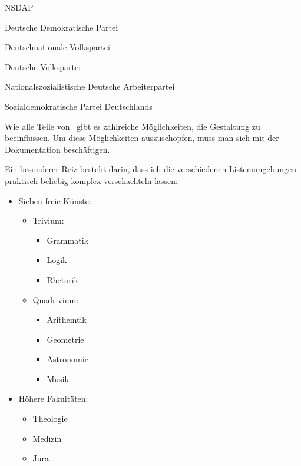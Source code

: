 \begin{lfgwexample}{}
 \begin{labeling}[=]{NSDAP}
  \item[DDP] Deutsche Demokratische Partei
  \item[DNVP] Deutschnationale Volkspartei
  \item[DVP] Deutsche Volkspartei
  \item[NSDAP] Nationalszozialistische Deutsche Arbeiterpartei
  \item[SPD] Sozialdemokratische Partei Deutschlands
 \end{labeling}
\end{lfgwexample}

Wie alle Teile von \KOMAScript\ gibt es zahlreiche Möglichkeiten, die Gestaltung zu
beeinflussen. Um diese Möglichkeiten auszuschöpfen, muss man sich mit der Dokumentation 
beschäftigen.



Ein besonderer Reiz besteht darin, dass ich die verschiedenen Listenumgebungen praktisch
beliebig komplex verschachteln lassen:

\begin{lfgwexample}{}
\begin{itemize}
 \item Sieben freie Künste:
 \begin{itemize}
   \item Trivium:
   \begin{itemize}
    \item Grammatik
    \item Logik
    \item Rhetorik
   \end{itemize}
   \item Quadrivium:
   \begin{itemize}
    \item Arithemtik
    \item Geometrie
    \item Astronomie
    \item Musik
   \end{itemize}
 \end{itemize}
 \item Höhere Fakultäten:
 \begin{itemize}
   \item Theologie
   \item Medizin
   \item Jura
 \end{itemize}
\end{itemize}
\end{lfgwexample}




